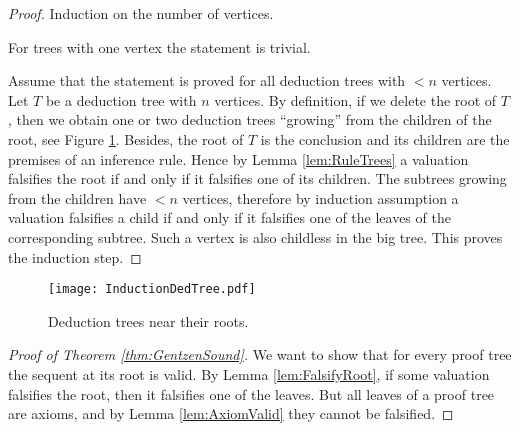 

\setcounter{section}{2}
\setcounter{subsection}{7}
\setcounter{dfn}{16}

\begin{proof}
Induction on the number of vertices.

For trees with one vertex the statement is trivial.

Assume that the statement is proved for all deduction trees with $< n$ vertices.
Let $T$ be a deduction tree with $n$ vertices.
By definition, if we delete the root of $T$, then we obtain one or two deduction trees ``growing'' from the children of the root,
see Figure \ref{fig:InductionDedTree}.
Besides, the root of $T$ is the conclusion and its children are the premises of an inference rule.
Hence by Lemma \ref{lem:RuleTrees} a valuation falsifies the root if and only if it falsifies one of its children.
The subtrees growing from the children have $< n$ vertices,
therefore by induction assumption a valuation falsifies a child if and only if it falsifies one of the leaves of the corresponding subtree.
Such a vertex is also childless in the big tree.
This proves the induction step.
\end{proof}

\begin{figure}[ht]
\begin{center}
\texttt{[image: InductionDedTree.pdf]}
\end{center}
\caption{Deduction trees near their roots.}
\label{fig:InductionDedTree}
\end{figure}

\begin{proof}[Proof of Theorem \ref{thm:GentzenSound}]
We want to show that for every proof tree the sequent at its root is valid.
By Lemma \ref{lem:FalsifyRoot}, if some valuation falsifies the root, then it falsifies one of the leaves.
But all leaves of a proof tree are axioms, and by Lemma \ref{lem:AxiomValid} they cannot be falsified.
\end{proof}



